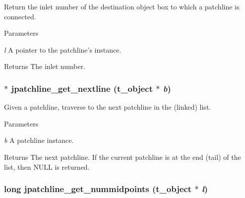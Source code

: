 Return the inlet number of the destination object box to which a patchline is connected. 
\begin{DoxyParams}{Parameters}
\item[{\em l}]A pointer to the patchline's instance. \end{DoxyParams}
\begin{DoxyReturn}{Returns}
The inlet number. 
\end{DoxyReturn}
\hypertarget{group__jpatchline_ga1aed89ce61ea59fbc47a282e25398aa8}{
\subsubsection[{jpatchline\_\-get\_\-nextline}]{$\ast$ jpatchline\_\-get\_\-nextline ({\bf t\_\-object} $\ast$ {\em b})}}
\label{group__jpatchline_ga1aed89ce61ea59fbc47a282e25398aa8}


Given a patchline, traverse to the next patchline in the (linked) list. 
\begin{DoxyParams}{Parameters}
\item[{\em b}]A patchline instance. \end{DoxyParams}
\begin{DoxyReturn}{Returns}
The next patchline. If the current patchline is at the end (tail) of the list, then NULL is returned. 
\end{DoxyReturn}
\hypertarget{group__jpatchline_ga42dc7b0cc71d75625f6580987a61f0e9}{
\subsubsection[{jpatchline\_\-get\_\-nummidpoints}]{\setlength{\rightskip}{0pt plus 5cm}long jpatchline\_\-get\_\-nummidpoints ({\bf t\_\-object} $\ast$ {\em l})}}
\label{group__jpatchline_ga42dc7b0cc71d75625f6580987a61f0e9}


